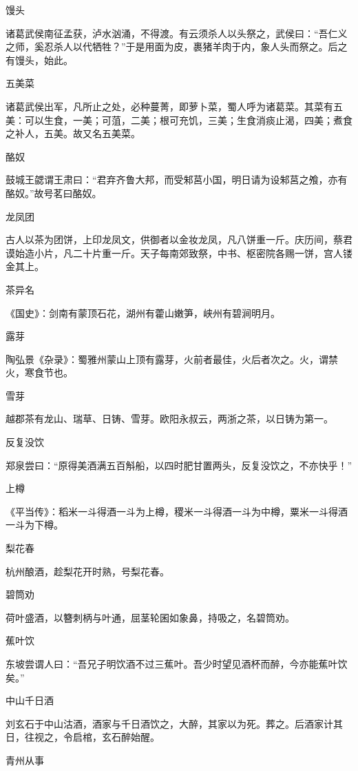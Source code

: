 \documentclass[a4paper,12pt,UTF8,twoside]{ctexbook}
\begin{document}
    馒头
    
    诸葛武侯南征孟获，泸水汹涌，不得渡。有云须杀人以头祭之，武侯曰：“吾仁义之师，奚忍杀人以代牺牲？”于是用面为皮，裹猪羊肉于内，象人头而祭之。后之有馒头，始此。
    
    五美菜
    
    诸葛武侯出军，凡所止之处，必种蔓菁，即萝卜菜，蜀人呼为诸葛菜。其菜有五美：可以生食，一美；可菹，二美；根可充饥，三美；生食消痰止渴，四美；煮食之补人，五美。故又名五美菜。
    
    酪奴
    
    鼓城王勰谓王肃曰：“君弃齐鲁大邦，而受邾莒小国，明日请为设邾莒之飧，亦有酪奴。”故号茗曰酪奴。
    
    龙凤团
    
    古人以茶为团饼，上印龙凤文，供御者以金妆龙凤，凡八饼重一斤。庆历间，蔡君谟始造小片，凡二十片重一斤。天子每南郊致祭，中书、枢密院各赐一饼，宫人镂金其上。
    
    茶异名
    
    《国史》：剑南有蒙顶石花，湖州有藿山嫩笋，峡州有碧涧明月。
    
    露芽
    
    陶弘景《杂录》：蜀雅州蒙山上顶有露芽，火前者最佳，火后者次之。火，谓禁火，寒食节也。
    
    雪芽
    
    越郡茶有龙山、瑞草、日铸、雪芽。欧阳永叔云，两浙之茶，以日铸为第一。
    
    反复没饮
    
    郑泉尝曰：“原得美酒满五百斛船，以四时肥甘置两头，反复没饮之，不亦快乎！”
    
    上樽
    
    《平当传》：稻米一斗得酒一斗为上樽，稷米一斗得酒一斗为中樽，粟米一斗得酒一斗为下樽。
    
    梨花春
    
    杭州酿酒，趁梨花开时熟，号梨花春。
    
    碧筒劝
    
    荷叶盛酒，以簪刺柄与叶通，屈茎轮囷如象鼻，持吸之，名碧筒劝。
    
    蕉叶饮
    
    东坡尝谓人曰：“吾兄子明饮酒不过三蕉叶。吾少时望见酒杯而醉，今亦能蕉叶饮矣。”
    
    中山千日酒
    
    刘玄石于中山沽酒，酒家与千日酒饮之，大醉，其家以为死。葬之。后酒家计其日，往视之，令启棺，玄石醉始醒。
    
    青州从事
    
\end{document}
